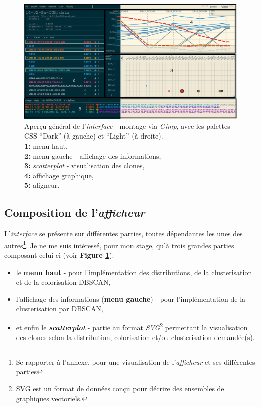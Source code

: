 \documentclass[pdftex,12pt,a4paper]{report}
\begin{document}
\begin{spacing}{1.2}
\begin{figure}[H]
\begin{center}
	\includegraphics[scale=0.35]{img/new_montage.jpg}
\end{center}
\caption{Aperçu général de l'\textit{interface} - montage via \textit{Gimp}, avec les palettes CSS ``Dark'' (à gauche) et ``Light'' (à droite).\\ \textbf{1:} menu haut,\\ \textbf{2:} menu gauche - affichage des informations,\\ \textbf{3:} \textit{scatterplot} - visualisation des clones,\\ \textbf{4:} affichage graphique,\\ \textbf{5:} aligneur.}
\label{fig:interface-montage}
\end{figure}

\subsection{Composition de l'\textit{afficheur}}

L'\textit{interface} se présente sur différentes parties, toutes dépendantes les unes des autres\footnote{Se rapporter à l'annexe, pour une visualisation de l'\textit{afficheur} et ses différentes parties}.
\newline Je ne me suis intéressé, pour mon stage, qu'à trois grandes parties composant celui-ci (voir \textbf{Figure \ref{fig:interface-montage}}):
\begin{itemize}
\item{le \textbf{menu haut} - pour l'implémentation des distributions, de la clusterisation et de la colorisation DBSCAN,}
\item{l'affichage des informations (\textbf{menu gauche}) - pour l'implémentation de la clusterisation par DBSCAN,}
\item{et enfin le \textbf{\textit{scatterplot}} - partie au format \textit{SVG}\footnote{SVG est un format de données conçu pour décrire des ensembles de graphiques vectoriels.} permettant la visualisation des clones selon la distribution, colorisation et/ou clusterisation demandée(s).}
\end{itemize}


\end{spacing}
\end{document}

